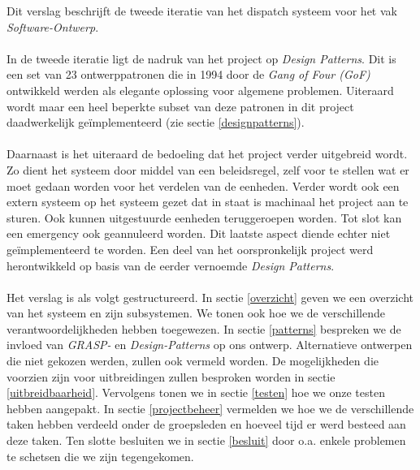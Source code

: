 Dit verslag beschrijft de tweede iteratie van het dispatch systeem voor het vak \textit{Software-Ontwerp}.
\paragraph{}
In de tweede iteratie ligt de nadruk van het project op \textit{Design Patterns}. Dit is een set van 23 ontwerppatronen die in 1994 door de \textit{Gang of Four (GoF)} ontwikkeld werden als elegante oplossing voor algemene problemen. Uiteraard wordt maar een heel beperkte subset van deze patronen in dit project daadwerkelijk ge\"implementeerd (zie sectie \ref{designpatterns}).
\paragraph{}
Daarnaast is het uiteraard de bedoeling dat het project verder uitgebreid wordt. Zo dient het systeem door middel van een beleidsregel, zelf voor te stellen wat er moet gedaan worden voor het verdelen van de eenheden. Verder wordt ook een extern systeem op het systeem gezet dat in staat is machinaal het project aan te sturen. Ook kunnen uitgestuurde eenheden teruggeroepen worden. Tot slot kan een emergency ook geannuleerd worden. Dit laatste aspect diende echter niet ge\"implementeerd te worden.
Een deel van het oorspronkelijk project werd herontwikkeld op basis van de eerder vernoemde \textit{Design Patterns}.
\paragraph{}
Het verslag is als volgt gestructureerd. In sectie \ref{overzicht} geven we een overzicht van het systeem en zijn subsystemen.
We tonen ook hoe we de verschillende verantwoordelijkheden hebben toegewezen.
In sectie \ref{patterns} bespreken we de invloed van \textit{GRASP-} en \textit{Design-Patterns} op ons ontwerp.
Alternatieve ontwerpen die niet gekozen werden, zullen ook vermeld worden.
De mogelijkheden die voorzien zijn voor uitbreidingen zullen besproken worden in sectie \ref{uitbreidbaarheid}.
Vervolgens tonen we in sectie \ref{testen} hoe we onze testen hebben aangepakt.
In sectie \ref{projectbeheer} vermelden we hoe we de verschillende taken hebben verdeeld onder de groepsleden
en hoeveel tijd er werd besteed aan deze taken.
Ten slotte besluiten we in sectie \ref{besluit} door o.a. enkele problemen te schetsen die we zijn tegengekomen.

